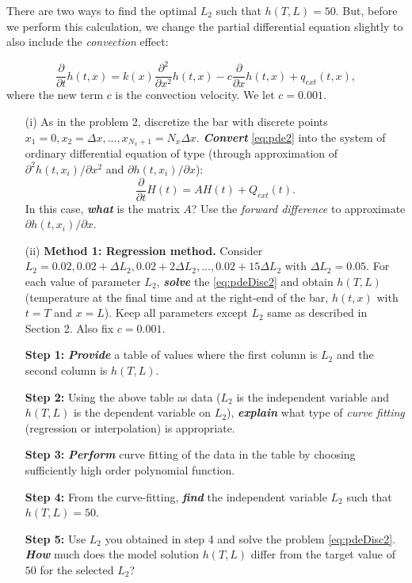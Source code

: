 \documentclass[11pt,a4paper]{article}
\newcommand{\p}{\partial }
\newcommand{\bfit}[1]{\textit{\textbf{#1}}}
\begin{document}
There are two ways to find the optimal $L_2$ such that $h(T, L) = 50$. But, before we perform this calculation, we change the partial differential equation slightly to also include the {\it convection} effect:

\begin{equation}\label{eq:pde2}
\frac{\p}{\p t} h(t, x) = k(x) \frac{\p^2 }{\p x^2} h(t, x) - c \frac{\p }{\p x} h(t, x) + q_{ext}(t, x),
\end{equation}
where the new term $c$ is the convection velocity. We let $c = 0.001$. 

\begin{itemize}
\item[(i)] As in the problem 2, discretize the bar with discrete points $x_1 = 0, x_2 = \Delta x, ..., x_{N_x + 1} = N_x \Delta x$. \bfit{Convert} \eqref{eq:pde2} into the system of ordinary differential equation of type (through approximation of $\p^2 h(t, x_i)/ \p x^2$ and $\p h(t, x_i)/\p x$):
\begin{equation}\label{eq:pdeDisc2}
\frac{\p}{\p t} H(t) = A H(t) + Q_{ext} (t).
\end{equation}
In this case, \bfit{what} is the matrix $A$? Use the {\it forward difference} to approximate $\p h(t, x_i)/\p x$. 

\item[(ii)] {\bf Method 1: Regression method.} Consider $L_2 = 0.02, 0.02+\Delta L_2, 0.02 + 2\Delta L_2, ..., 0.02 + 15\Delta L_2$ with $\Delta L_2 = 0.05$. For each value of parameter $L_2$, \bfit{solve} the \eqref{eq:pdeDisc2} and obtain $h(T, L)$ (temperature at the final time and at the right-end of the bar, $h(t, x)$ with $t = T$ and $x = L$). Keep all parameters except $L_2$ same as described in Section 2. Also fix $c = 0.001$.

{\bf Step 1: } \bfit{Provide} a table of values where the first column is $L_2$ and the second column is $h(T, L)$. 

{\bf Step 2: } Using the above table as data ($L_2$ is the independent variable and $h(T, L)$ is the dependent variable on $L_2$), \bfit{explain} what type of {\it curve fitting} (regression or interpolation) is appropriate.

{\bf Step 3: } \bfit{Perform} curve fitting of the data in the table by choosing sufficiently high order polynomial function.

{\bf Step 4: } From the curve-fitting, \bfit{find} the independent variable $L_2$ such that $h(T, L) = 50$. 

{\bf Step 5: } Use $L_2$ you obtained in step 4 and solve the problem \eqref{eq:pdeDisc2}. \bfit{How} much does the model solution $h(T, L)$ differ from the target value of $50$ for the selected $L_2$?


\end{itemize}
\end{document}
